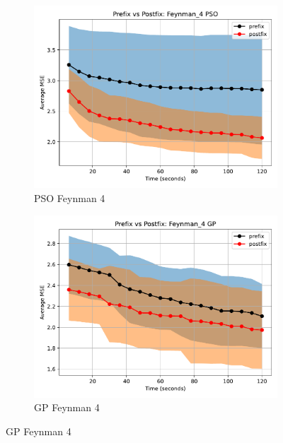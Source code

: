 \documentclass[runningheads]{llncs}
\begin{document}
\begin{figure}
    \vspace{0.5cm}
    
    \begin{subfigure}[b]{0.4\textwidth}
        \includegraphics[width=\linewidth, keepaspectratio]{AIFeynman_Benchmarks/PrePostFeynman_4PSO.pdf}
        \caption{PSO Feynman 4}
        \label{subfig:feynman_4_PSO}
    \end{subfigure}
    \begin{subfigure}[b]{0.4\textwidth}
        \includegraphics[width=\linewidth, keepaspectratio]{AIFeynman_Benchmarks/PrePostFeynman_4GP.pdf}
        \caption{GP Feynman 4}
        \label{subfig:feynman_4_GP}
    \end{subfigure}
    

\end{figure}
\end{document}
